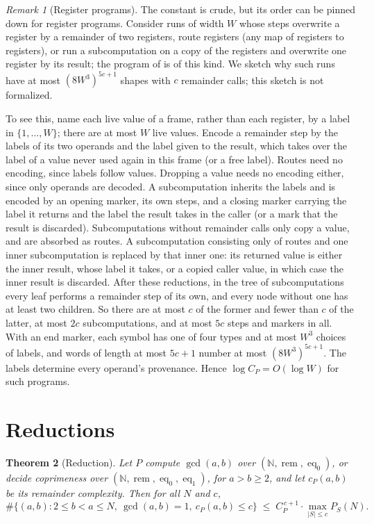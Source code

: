 \documentclass[11pt]{article}
\newtheorem{theorem}{Theorem}
\theoremstyle{remark}
\newtheorem{remark}[theorem]{Remark}
\newcommand{\rem}{\operatorname{rem}}
\newcommand{\eq}{\operatorname{eq}}
\begin{document}
\begin{remark}[Register programs]\label{rem:width}
The constant is crude, but its order can be pinned down for register
programs. Consider runs of width $W$ whose steps overwrite a register by a
remainder of two registers, route registers (any map of registers to
registers), or run a subcomputation on a copy of the registers and overwrite
one register by its result; the program of \cite{fixedwidth} is of this
kind. We sketch why such runs have at most $(8W^3)^{5c+1}$ shapes with $c$
remainder calls; this sketch is not formalized.

To see this, name each live value of a frame, rather than each register, by
a label in $\{1,\ldots,W\}$; there are at most $W$ live values. Encode a
remainder step by the labels of its two operands and the label given to the
result, which takes over the label of a value never used again in this frame
(or a free label). Routes need no encoding, since labels follow values.
Dropping a value needs no encoding either, since only operands are decoded.
A subcomputation inherits the labels and is encoded by an opening marker, its
own steps, and a closing marker carrying the label it returns and the label
the result takes in the caller (or a mark that the result is discarded).
Subcomputations without remainder calls only copy a value, and are absorbed
as routes. A subcomputation consisting only of routes and one inner
subcomputation is replaced by that inner one: its returned value is either
the inner result, whose label it takes, or a copied caller value, in which
case the inner result is discarded. After these reductions, in the tree of
subcomputations every leaf performs a remainder step of its own, and every
node without one has at least two children. So there are at most $c$ of the
former and fewer than $c$ of the latter, at most $2c$ subcomputations, and at
most $5c$ steps and markers in all. With an end marker, each symbol has one
of four types and at most $W^3$ choices of labels, and words of length at
most $5c+1$ number at most $(8W^3)^{5c+1}$. The labels determine every
operand's provenance. Hence $\log C_P=O(\log W)$ for such programs.
\end{remark}

\section{Reductions}

\begin{theorem}[Reduction]\label{thm:reduction}
Let $P$ compute $\gcd(a,b)$ over $(\mathbb N,\rem,\eq_0)$, or decide coprimeness
over $(\mathbb N,\rem,\eq_0,\eq_1)$, for $a>b\geq2$, and let $c_P(a,b)$ be its
remainder complexity. Then for all $N$ and $c$,
\[
\#\{(a,b):2\leq b<a\leq N,\ \gcd(a,b)=1,\ c_P(a,b)\leq c\}
\;\leq\;C_P^{\,c+1}\cdot\max_{|S|\leq c}P_S(N).
\]
\end{theorem}
\end{document}
